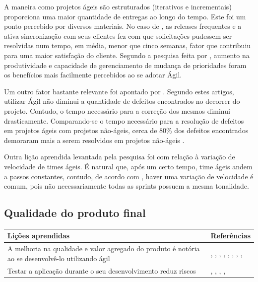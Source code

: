 A maneira como projetos ágeis são estruturados (iterativos e incrementais) proporciona uma maior quantidade de entregas ao longo do tempo. Este foi um ponto percebido por diversos materiais. No caso de \cite{Fitzgerald2013}, as releases frequentes e a ativa sincronização com  seus clientes fez com que solicitações pudessem ser resolvidas num tempo, em média, menor que cinco semanas, fator que contribuiu para uma maior satisfação do cliente. Segundo a pesquisa feita por \cite{Claudia2013}, aumento na produtividade e capacidade de gerenciamento de mudança de prioridades foram os benefícios mais facilmente percebidos ao se adotar Ágil.

Um outro fator bastante relevante foi apontado por \cite{Microsoft2013,Korhonen2010}. Segundo estes artigos, utilizar Ágil não diminui a quantidade de defeitos encontrados no decorrer do projeto. Contudo, o tempo necessário para a correção dos mesmos diminui drasticamente. Comparando-se o tempo necessário para a resolução de defeitos em projetos ágeis com projetos não-ágeis, cerca de 80\% dos defeitos encontrados demoraram mais a serem resolvidos em projetos não-ágeis \cite{Korhonen2010}.

Outra lição aprendida levantada pela pesquisa foi com relação à variação de velocidade de times ágeis. É natural que, após um certo tempo, time ágeis andem a passos constantes, contudo, de acordo com \cite{Piegas2012}, haver uma variação de velocidade é comum, pois não necessariamente todas as sprints possuem a mesma tonalidade.

\subsection{Qualidade do produto final}

\begin{table}[H]
	\centering
	\begin{tabularx}{\linewidth}{ | X | p{5cm} | } \hline \textbf{Lições aprendidas} & \textbf{Referências} \\ \hline
		A melhoria na qualidade e valor agregado do produto é notória ao se desenvolvê-lo utilizando ágil & \cite{Adobe2012}, \cite{Fitzgerald2013}, \cite{Bustard2013}, \cite{Lapham2012}, \cite{Eunha2012}, \cite{Claudia2013}, \cite{Parzinello2012}, \cite{Maciel2013}, \cite{Ahmed2008} \\ \hline
		Testar a aplicação durante o seu desenvolvimento reduz riscos & \cite{Korhonen2010}, \cite{Lapham2012}, \cite{Eunha2012}, \cite{Parzinello2012}, \cite{Ahmed2008} \\ \hline
	\end{tabularx}
\end{table}

